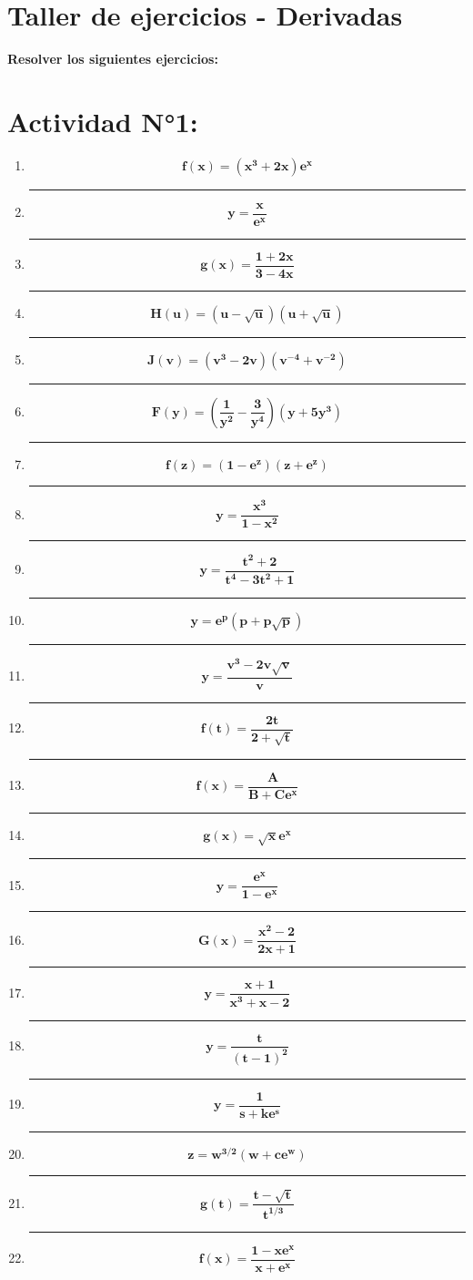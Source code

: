 \documentclass[12pt]{article}
\begin{document}
    

    \section*{\centering Taller de ejercicios - Derivadas} 
        \textbf{Resolver los siguientes ejercicios:}

    \section*{Actividad N°1:}
        \vspace{0.5cm}
        \begin{enumerate}[label=\textbf{\arabic*)}] 
            \hrule\item \[\bm{f(x) = (x^3 + 2x) e^x}\]
            \hrule\item \[\bm{y = \frac{x}{e^x}}\]
            \hrule\item \[\bm{g(x) = \frac{1 + 2x}{3 - 4x}}\]
            \hrule\item \[\bm{H(u) = (u - \sqrt{u})(u + \sqrt{u})}\]
            \hrule\item \[\bm{J(v) = (v^3 - 2v)(v^{-4} + v^{-2})}\]
            \hrule\item \[\bm{F(y) = \left(\frac{1}{y^2} - \frac{3}{y^4}\right)(y + 5y^3)}\]
            \hrule\item \[\bm{f(z) = (1 - e^z)(z + e^z)}\]
            \hrule\item \[\bm{y = \frac{x^3}{1 - x^2}}\]
            \hrule\item \[\bm{y = \frac{t^2 + 2}{t^4 - 3t^2 + 1}}\]
            \hrule\item \[\bm{y = e^p(p + p \sqrt{p})}\]
            \hrule\item \[\bm{y = \frac{v^3 - 2v \sqrt{v}}{v}}\]
            \hrule\item \[\bm{f(t) = \frac{2t}{2 + \sqrt{t}}}\]
            \hrule\item \[\bm{f(x) = \frac{A}{B + Ce^x}}\]
            \hrule\item \[\bm{g(x) = \sqrt{x} e^x}\]
            \hrule\item \[\bm{y = \frac{e^x}{1 - e^x}}\]
            \hrule\item \[\bm{G(x) = \frac{x^2 - 2}{2x + 1}}\]
            \hrule\item \[\bm{y = \frac{x + 1}{x^3 + x - 2}}\]
            \hrule\item \[\bm{y = \frac{t}{(t - 1)^2}}\]
            \hrule\item \[\bm{y = \frac{1}{s + ke^s}}\]
            \hrule\item \[\bm{z = w^{3/2} (w + ce^w)}\]
            \hrule\item \[\bm{g(t) = \frac{t - \sqrt{t}}{t^{1/3}}}\]
            \hrule\item \[\bm{f(x) = \frac{1 - xe^x}{x + e^x}}\]
        \end{enumerate}
\end{document}
